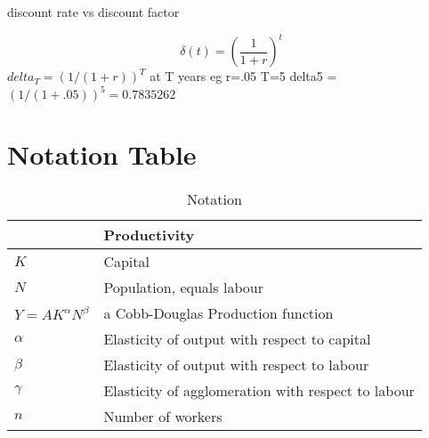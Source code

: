 discount rate vs discount factor

\[\delta(t)=\left(\frac{1}{1+r}\right)^t\]
    $delta_T=  (1/(1+r))^T$   at T years
    eg r=.05  T=5  delta5 =  $(1/(1+.05))^5 = 0.7835262$


\section{Notation Table}
\begin{longtable}{lp{10cm}}
\caption{Notation}                       \\

\hline           &  \textbf{Productivity} \\ \hline
$K$              &  Capital               \\ 
$N$              &  Population, equals labour \\ %
$Y=A K^{\alpha }N^{\beta }$  &  a Cobb-Douglas Production function \\ %
$\alpha$         &  Elasticity of output with respect to capital          \\
$\beta$          &  Elasticity of output with respect to labour           \\ %
$\gamma$         &  Elasticity of agglomeration with respect to labour    \\ %

$n$  &  Number of workers \\


\end{longtable}
